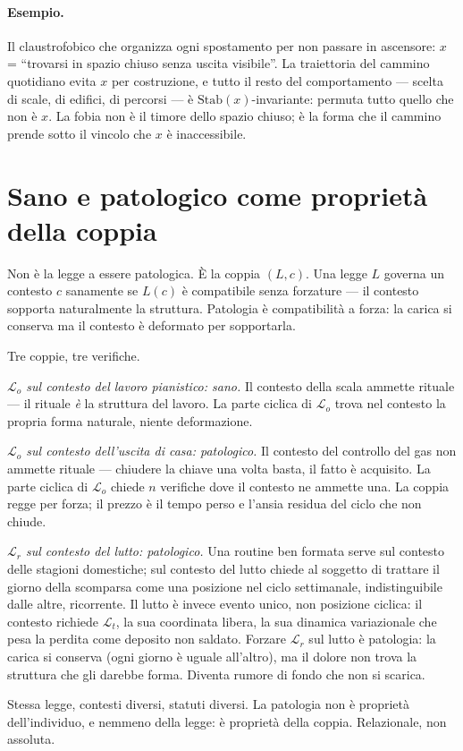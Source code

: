 \documentclass[
    oneside,                 %
    openany,                 %
    titlepage,
    11pt,
    a4paper,
    italian,
    DIV=14,                  %
    headinclude,
    footinclude=true,
    cleardoublepage=empty
]{scrbook}
\theoremstyle{ctplain}
\theoremstyle{ctdef}
\theoremstyle{ctrem}
\newcommand{\Lt}{\mathcal{L}_t}
\newcommand{\Lo}{\mathcal{L}_o}
\newcommand{\Lr}{\mathcal{L}_r}
\begin{document}
\paragraph{Esempio.} Il claustrofobico che organizza ogni spostamento per non passare in ascensore: $x$ = ``trovarsi in spazio chiuso senza uscita visibile''. La traiettoria del cammino quotidiano evita $x$ per costruzione, e tutto il resto del comportamento --- scelta di scale, di edifici, di percorsi --- è $\mathrm{Stab}(x)$-invariante: permuta tutto quello che non è $x$. La fobia non è il timore dello spazio chiuso; è la forma che il cammino prende sotto il vincolo che $x$ è inaccessibile.

\section*{Sano e patologico come proprietà della coppia}

Non è la legge a essere patologica. È la coppia $(L, c)$. Una legge $L$ governa un contesto $c$ sanamente se $L(c)$ è compatibile senza forzature --- il contesto sopporta naturalmente la struttura. Patologia è compatibilità a forza: la carica si conserva ma il contesto è deformato per sopportarla.

Tre coppie, tre verifiche.

\emph{$\Lo$ sul contesto del lavoro pianistico: sano.} Il contesto della scala ammette rituale --- il rituale \emph{è} la struttura del lavoro. La parte ciclica di $\Lo$ trova nel contesto la propria forma naturale, niente deformazione.

\emph{$\Lo$ sul contesto dell'uscita di casa: patologico.} Il contesto del controllo del gas non ammette rituale --- chiudere la chiave una volta basta, il fatto è acquisito. La parte ciclica di $\Lo$ chiede $n$ verifiche dove il contesto ne ammette una. La coppia regge per forza; il prezzo è il tempo perso e l'ansia residua del ciclo che non chiude.

\emph{$\Lr$ sul contesto del lutto: patologico.} Una routine ben formata serve sul contesto delle stagioni domestiche; sul contesto del lutto chiede al soggetto di trattare il giorno della scomparsa come una posizione nel ciclo settimanale, indistinguibile dalle altre, ricorrente. Il lutto è invece evento unico, non posizione ciclica: il contesto richiede $\Lt$, la sua coordinata libera, la sua dinamica variazionale che pesa la perdita come deposito non saldato. Forzare $\Lr$ sul lutto è patologia: la carica si conserva (ogni giorno è uguale all'altro), ma il dolore non trova la struttura che gli darebbe forma. Diventa rumore di fondo che non si scarica.

Stessa legge, contesti diversi, statuti diversi. La patologia non è proprietà dell'individuo, e nemmeno della legge: è proprietà della coppia. Relazionale, non assoluta.
\end{document}
